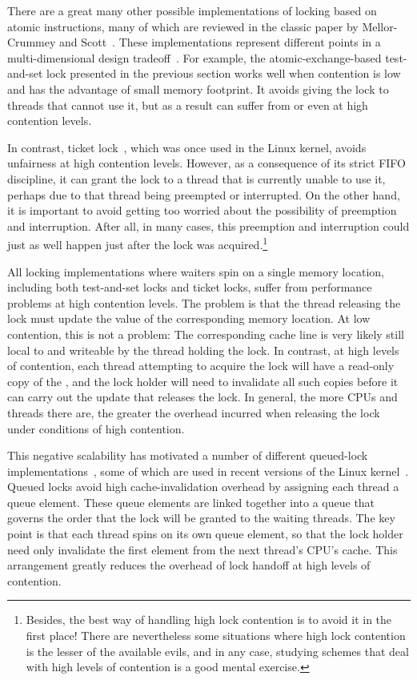 There are a great many other possible implementations of locking based
on atomic instructions, many of which are reviewed in the classic paper
by Mellor-Crummey and Scott~\cite{MellorCrummey91a}.
These implementations represent different points in a multi-dimensional
design tradeoff~\cite{Guerraoui:2019:LPA:3319851.3301501,HugoGuirouxPhD,McKenney96a}.
For example,
the atomic-exchange-based test-and-set lock presented in the previous
section works well when contention is low and has the advantage
of small memory footprint.
It avoids giving the lock to threads that cannot use it, but as
a result can suffer from  or even  at high
contention levels.

In contrast, ticket lock~\cite{MellorCrummey91a}, which was once used
in the Linux kernel, avoids unfairness at high contention levels.
However, as a consequence of its strict FIFO discipline, it can grant
the lock to a thread that is currently unable to use it, perhaps due
to that thread being preempted or interrupted.
On the other hand, it is important to avoid getting too worried about the
possibility of preemption and interruption.
After all, in many cases, this preemption and interruption could just
as well happen just after the lock was
acquired.\footnote{
	Besides, the best way of handling high lock contention is to avoid
	it in the first place!
	There are nevertheless some situations where high lock contention
	is the lesser of the available evils, and in any case, studying
	schemes that deal with high levels of contention is a good mental
	exercise.}

All locking implementations where waiters spin on a single memory
location, including both test-and-set locks and ticket locks,
suffer from performance problems at high contention levels.
The problem is that the thread releasing the lock must update the
value of the corresponding memory location.
At low contention, this is not a problem: The corresponding cache line
is very likely still local to and writeable by the thread holding
the lock.
In contrast, at high levels of contention, each thread attempting to
acquire the lock will have a read-only copy of the , and
the lock holder will need to invalidate all such copies before it
can carry out the update that releases the lock.
In general, the more CPUs and threads there are, the greater the
overhead incurred when releasing the lock under conditions of
high contention.

This negative scalability has motivated a number of different
queued-lock
implementations~\cite{Anderson90,Graunke90,MellorCrummey91a,Wisniewski94,Craig93,Magnusson94,Takada93},
some of which are used in recent versions of the Linux
kernel~\cite{JonathanCorbet2014qspinlocks}.
Queued locks avoid high cache-invalidation overhead by assigning each
thread a queue element.
These queue elements are linked together into a queue that governs the
order that the lock will be granted to the waiting threads.
The key point is that each thread spins on its own queue element,
so that the lock holder need only invalidate the first element from
the next thread's CPU's cache.
This arrangement greatly reduces the overhead of lock handoff at high
levels of contention.

